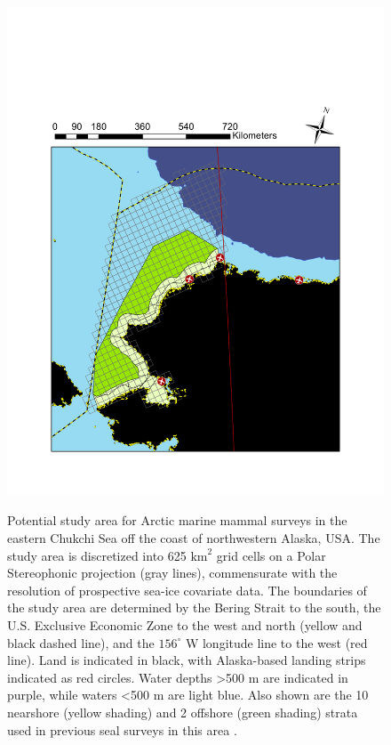 \documentclass[]{rsos}%
\begin{document}
\begin{figure}[ht]
\centering
\caption{Potential study area for Arctic marine mammal surveys in the eastern Chukchi Sea off the coast of northwestern Alaska, USA. The study area is discretized into 625 $\textrm{km}^2$ grid cells on a Polar Stereophonic projection (gray lines), commensurate with the resolution of prospective sea-ice covariate data.  The boundaries of the study area are determined by the Bering Strait to the south, the U.S. Exclusive Economic Zone to the west and north (yellow and black dashed line), and the $156^{\circ}$ W longitude line to the west (red line). Land is indicated in black, with Alaska-based landing strips indicated as red circles. Water depths >500 m are indicated in purple, while waters <500 m are light blue.  Also shown are the 10 nearshore (yellow shading) and 2 offshore (green shading) strata used in previous seal surveys in this area \cite{Bengtson2005}.  }
\includegraphics[width=\linewidth]{LOSI_Planning_2016}
\label{fig:Chukchi}
\end{figure}
\end{document}

